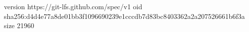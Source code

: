 version https://git-lfs.github.com/spec/v1
oid sha256:d4d4e77a8de01bb3f1096690239e1cccdb7d83bc8403362a2a207526661b6f3a
size 21960
